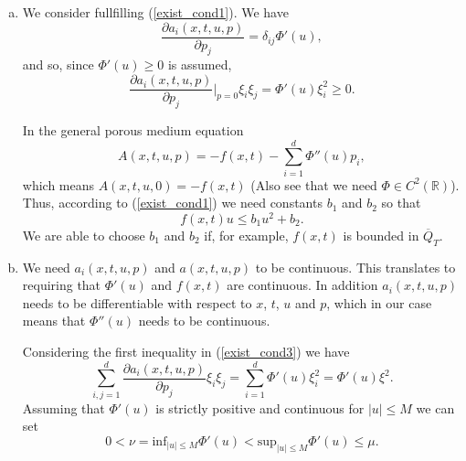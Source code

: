 \documentclass[11pt, a4paper]{article}
\begin{document}
\begin{enumerate}[a)]
	\item We consider fullfilling (\ref{exist_cond1}). We have
	\begin{equation*}
		\frac{\partial a_i(x,t,u,p)}{\partial p_j} = \delta_{ij} \Phi'(u),
	\end{equation*}
	and so, since $\Phi'(u) \geq 0$ is assumed,
	\begin{equation*}
		\frac{\partial a_i(x,t,u,p)}{\partial p_j}\Bigg|_{p=0}\xi_i\xi_j = \Phi'(u)\xi_i^2 \geq 0.
	\end{equation*}
	
	In the general porous medium equation
	\begin{equation*}
		A(x,t,u,p) = -f(x,t) - \sum_{i=1}^d \Phi''(u)p_i,
	\end{equation*}
	which means $A(x,t,u,0) = -f(x,t)$ (Also see that we need $\Phi \in C^2(\mathbb{R})$). Thus, according to (\ref{exist_cond1}) we need constants $b_1$ and $b_2$ so that
	\begin{equation*}
		f(x,t)u \leq b_1 u^2 + b_2.
	\end{equation*}
	We are able to choose $b_1$ and $b_2$ if, for example, $f(x,t)$ is bounded in $\overline{Q}_T$.
	
	\item We need $a_i(x,t,u,p)$ and $a(x,t,u,p)$ to be continuous. This translates to requiring that $\Phi'(u)$ and $f(x,t)$ are continuous. In addition $a_i(x,t,u,p)$ needs to be differentiable with respect to $x$, $t$, $u$ and $p$, which in our case means that $\Phi''(u)$ needs to be continuous.
	
	Considering the first inequality in (\ref{exist_cond3}) we have
	\begin{equation*}
		\sum_{i,j=1}^d \frac{\partial a_i(x,t,u,p)}{\partial p_j} \xi_i \xi_j = \sum_{i=1}^d \Phi'(u)\xi_i^2 =\Phi'(u)\xi^2.
	\end{equation*}
	Assuming that $\Phi'(u)$ is strictly positive and continuous for $|u|\leq M$ we can set
	\begin{equation}
	0 < \nu = \text{inf}_{|u| \leq M}\Phi'(u) < \text{sup}_{|u| \leq M}\Phi'(u) \leq \mu.
	\end{equation}
	

\end{enumerate}
\end{document}

